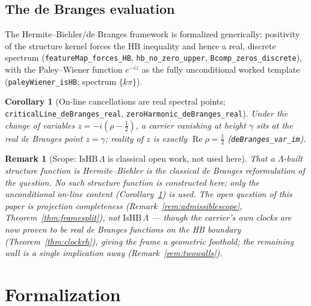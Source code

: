 \documentclass[11pt]{article}
\newtheorem{corollary}[definition]{Corollary}
\newtheorem{remark}[definition]{Remark}
\DeclareMathOperator{\Ree}{Re}
\newcommand{\code}[1]{\texttt{#1}}
\begin{document}
\subsection{The de Branges evaluation}\label{sec:debranges}
The Hermite--Biehler/de Branges framework is formalized generically: positivity of the structure
kernel forces the $\mathrm{HB}$ inequality and hence a real, discrete spectrum
(\code{featureMap\_forces\_HB}, \code{hb\_no\_zero\_upper}, \code{Bcomp\_zeros\_discrete}), with the
Paley--Wiener function $e^{-iz}$ as the fully unconditional worked template
(\code{paleyWiener\_isHB}; spectrum $\{k\pi\}$).
\begin{corollary}[On-line cancellations are real spectral points; \code{criticalLine\_deBranges\_real}, \code{zeroHarmonic\_deBranges\_real}]\label{cor:online}
Under the change of variables $z=-i(\rho-\tfrac12)$, a carrier vanishing at height $\gamma$ sits at
the \emph{real} de Branges point $z=\gamma$; reality of $z$ is exactly $\Ree\rho=\tfrac12$
(\code{deBranges\_var\_im}).
\end{corollary}
\begin{remark}[Scope: $\mathrm{IsHB}\,\Lambda$ is classical open work, not used here]\label{rem:hbscope}
That a $\Lambda$-built structure function is Hermite--Biehler is the classical de Branges
reformulation of the question.  No such structure function is constructed here; only the unconditional on-line content (Corollary~\ref{cor:online}) is used.  The open
question of this paper is projection completeness (Remark~\ref{rem:admissiblescope},
Theorem~\ref{thm:framesplit}), not $\mathrm{IsHB}\,\Lambda$ --- though the carrier's own clocks
are now proven to be real de Branges functions on the HB boundary (Theorem~\ref{thm:clockrh}),
giving the frame a geometric foothold; the remaining wall is a single implication away
(Remark~\ref{rem:twowalls}).
\end{remark}

\section{Formalization}\label{sec:formal}
\end{document}

